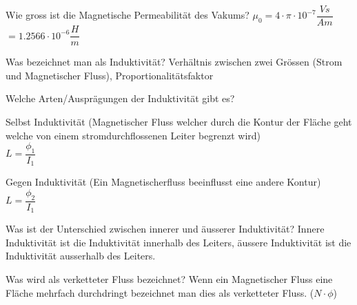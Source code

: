 
\begin{lk}{Wie gross ist die Magnetische Permeabilität des Vakums?}
	\LARGE{$ \mu_0 = 4 \cdot \pi \cdot 10^{-7} \dfrac{Vs}{Am} $ \\[12pt] $ = 1.2566  \cdot 10^{-6} \dfrac{H}{m}$}
\end{lk}

\begin{lk}{Was bezeichnet man als Induktivität?}
	Verhältnis zwischen zwei Grössen (Strom und Magnetischer Fluss), Proportionalitätsfaktor\\[12pt]
\end{lk}

\begin{lk}{Welche Arten/Ausprägungen der Induktivität gibt es?}
	\begin{compactitem}
		\item Selbst Induktivität (Magnetischer Fluss welcher durch die Kontur der Fläche geht welche von einem stromdurchflossenen Leiter begrenzt wird)\\
		$ L = \dfrac{\phi_1}{I_1} $
		\item Gegen Induktivität (Ein Magnetischerfluss beeinflusst eine andere Kontur)\\
		$ L = \dfrac{\phi_2}{I_1} $
	\end{compactitem}
\end{lk}

\begin{lk}{Was ist der Unterschied zwischen innerer und äusserer Induktivität?}
	Innere Induktivität ist die Induktivität innerhalb des Leiters, äussere Induktivität ist die Induktivität ausserhalb des Leiters.
\end{lk}

\begin{lk}{Was wird als verketteter Fluss bezeichnet?}
	Wenn ein Magnetischer Fluss eine Fläche mehrfach durchdringt bezeichnet man dies als verketteter Fluss. ($ N \cdot \phi $)
\end{lk}